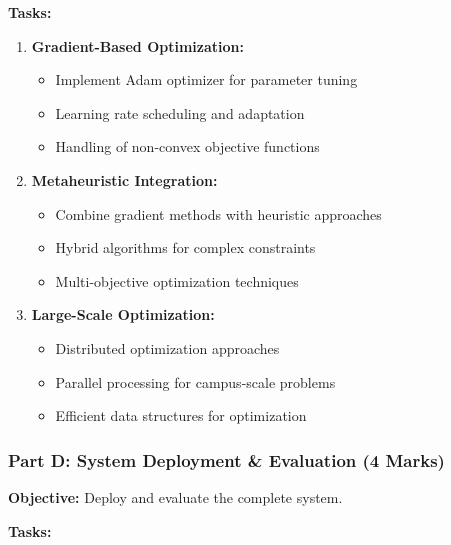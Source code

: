 \documentclass[
  letterpaper,
  DIV=11,
  numbers=noendperiod]{scrreprt}
\providecommand{\tightlist}{%
  \setlength{\itemsep}{0pt}\setlength{\parskip}{0pt}}
\begin{document}
\textbf{Tasks:}

\begin{enumerate}
\def\labelenumi{\arabic{enumi}.}
\item
  \textbf{Gradient-Based Optimization:}

  \begin{itemize}
  \tightlist
  \item
    Implement Adam optimizer for parameter tuning
  \item
    Learning rate scheduling and adaptation
  \item
    Handling of non-convex objective functions
  \end{itemize}
\item
  \textbf{Metaheuristic Integration:}

  \begin{itemize}
  \tightlist
  \item
    Combine gradient methods with heuristic approaches
  \item
    Hybrid algorithms for complex constraints
  \item
    Multi-objective optimization techniques
  \end{itemize}
\item
  \textbf{Large-Scale Optimization:}

  \begin{itemize}
  \tightlist
  \item
    Distributed optimization approaches
  \item
    Parallel processing for campus-scale problems
  \item
    Efficient data structures for optimization
  \end{itemize}
\end{enumerate}

\subsubsection{Part D: System Deployment \& Evaluation (4
Marks)}\label{part-d-system-deployment-evaluation-4-marks}

\textbf{Objective:} Deploy and evaluate the complete system.

\textbf{Tasks:}
\end{document}
